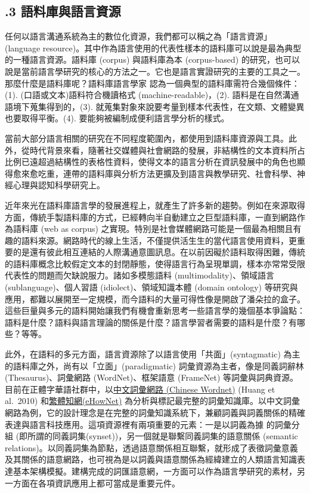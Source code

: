 \subsection{.3 語料庫與語言資源}

任何以語言溝通系統為主的數位化資源，我們都可以稱之為「語言資源」(language resource)。其中作為語言使用的代表性樣本的語料庫可以說是最為典型的一種語言資源。語料庫 (corpus) 與語料庫為本 (corpus-based) 的研究，也可以說是當前語言學研究的核心的方法之一。它也是語言實證研究的主要的工具之一。那麼什麼是語料庫呢？語料庫語言學家 \citet{Gries2019} 認為一個典型的語料庫需符合幾個條件：(1). (口語或文本)語料符合機讀格式 (machine-readable)，(2). 語料是在自然溝通語境下蒐集得到的，(3). 就蒐集對象來說要考量到樣本代表性，在文類、文體變異也要取得平衡。(4). 要能夠被編制成便利語言學分析的樣式。

當前大部分語言相關的研究在不同程度範圍內，都使用到語料庫資源與工具。此外，從時代背景來看，隨著社交媒體與社會網路的發展，非結構性的文本資料所占比例已遠超過結構性的表格性資料，使得文本的語言分析在資訊發展中的角色也顯得愈來愈吃重，連帶的語料庫與分析方法更擴及到語言與教學研究、社會科學、神經心理與認知科學研究上。

近年來光在語料庫語言學的發展進程上，就產生了許多新的趨勢。例如在來源取得方面，傳統手製語料庫的方式，已經轉向半自動建立之巨型語料庫，一直到網路作為語料庫 (web as corpus) 之實現。特別是社會媒體網路可能是一個最為相關且有趣的語料來源。網路時代的線上生活，不僅提供活生生的當代語言使用資料，更重要的是還有彼此相互連結的人際溝通意圖訊息。在以前因礙於語料取得困難，傳統的語料庫概念比較假定文本的封閉靜態，使得語言行為呈現單調，樣本亦常常受限代表性的問題而欠缺說服力。諸如多模態語料 (multimodality)、領域語言 (sublanguage)、個人習語 (idiolect)、領域知識本體 (domain ontology) 等研究與應用，都難以展開至一定規模，而今語料的大量可得性像是開啟了潘朵拉的盒子。這些巨量與多元的語料開始讓我們有機會重新思考一些語言學的幾個基本爭論點：語料是什麼？語料與語言理論的關係是什麼？語言學習者需要的語料是什麼？有哪些？等等。

此外，在語料的多元方面，語言資源除了以語言使用「共面」(syntagmatic) 為主的語料庫之外，尚有以「立面」(paradigmatic) 詞彙資源為主者，像是同義詞辭林 (Thesaurus)、詞彙網路 (WordNet)、框架語意 (FrameNet) 等詞彙與詞典資源。目前在正體字華語社群中，以\href{https://lope.linguistics.ntu.edu.tw/cwn2/}{中文詞彙網路}\href{https://lope.linguistics.ntu.edu.tw/cwn2/}{ (Chinese Wordnet)} (Huang et al.~2010) 和\href{http://ehownet.iis.sinica.edu.tw/}{繁體知網}\href{http://ehownet.iis.sinica.edu.tw/}{(eHowNet)} 為分析與標記最完整的詞彙知識庫。以中文詞彙網路為例，它的設計理念是在完整的詞彙知識系統下，兼顧詞義與詞義關係的精確表達與語言科技應用。這項資源裡有兩項重要的元素：一是以詞義為據 的詞彙分組 (即所謂的同義詞集(synset))，另一個就是聯繫同義詞集的語意關係 (semantic relations)。以同義詞集為節點，透過語意關係相互聯繫，就形成了表徵詞彙意義及其關係的語意網路，也可視為是以詞義與語意關係為經緯建立的人類語言知識表達基本架構模擬。建構完成的詞匯語意網，一方面可以作為語言學研究的素材，另一方面在各項資訊應用上都可當成是重要元件。

